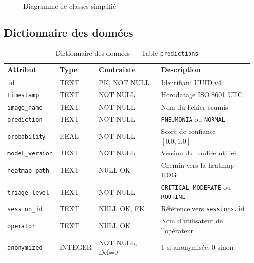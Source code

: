 \documentclass[12pt, a4paper]{report}
\begin{document}
\begin{figure}[p]
\caption{Diagramme de classes simplifié}
\end{figure}
\clearpage

\subsection{Dictionnaire des données}

\begin{table}[H]
\centering
\caption{Dictionnaire des données --- Table \texttt{predictions}}
\begin{tabularx}{\textwidth}{L{3cm} L{2.5cm} L{2cm} X}
\toprule
\textbf{Attribut} & \textbf{Type} & \textbf{Contrainte} & \textbf{Description} \\
\midrule
\texttt{id}            & TEXT    & PK, NOT NULL   & Identifiant UUID v4 \\
\texttt{timestamp}     & TEXT    & NOT NULL       & Horodatage ISO 8601 UTC \\
\texttt{image\_name}   & TEXT    & NOT NULL       & Nom du fichier soumis \\
\texttt{prediction}    & TEXT    & NOT NULL       & \texttt{PNEUMONIA} ou \texttt{NORMAL} \\
\texttt{probability}   & REAL    & NOT NULL       & Score de confiance $[0.0, 1.0]$ \\
\texttt{model\_version}& TEXT    & NOT NULL       & Version du modèle utilisé \\
\texttt{heatmap\_path} & TEXT    & NULL OK        & Chemin vers la heatmap HOG \\
\texttt{triage\_level} & TEXT    & NOT NULL       & \texttt{CRITICAL}, \texttt{MODERATE} ou \texttt{ROUTINE} \\
\texttt{session\_id}   & TEXT    & NULL OK, FK    & Référence vers \texttt{sessions.id} \\
\texttt{operator}      & TEXT    & NULL OK        & Nom d'utilisateur de l'opérateur \\
\texttt{anonymized}    & INTEGER & NOT NULL, Def=0& 1 si anonymisée, 0 sinon \\
\bottomrule
\end{tabularx}
\end{table}
\end{document}
